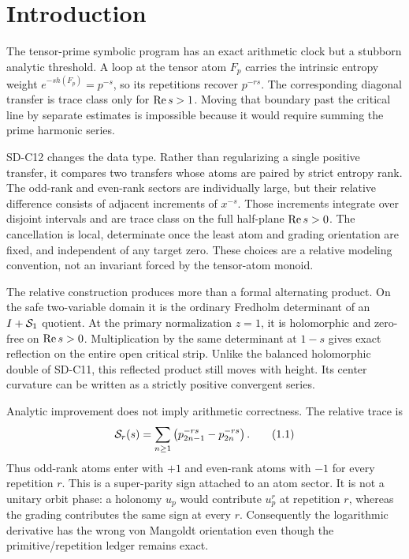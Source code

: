\section{Introduction}
\label{sec:introduction}

The tensor-prime symbolic program has an exact arithmetic clock but a stubborn
analytic threshold.  A loop at the tensor atom $F_p$ carries the intrinsic
entropy weight $e^{-s h(F_p)}=p^{-s}$, so its repetitions recover $p^{-rs}$.
The corresponding diagonal transfer is trace class only for $\operatorname{Re} s>1$.
Moving that boundary past the critical line by separate estimates is
impossible because it would require summing the prime harmonic series.

SD-C12 changes the data type.  Rather than regularizing a single positive
transfer, it compares two transfers whose atoms are paired by strict entropy
rank.  The odd-rank and even-rank sectors are individually large, but their
relative difference consists of adjacent increments of $x^{-s}$.  Those
increments integrate over disjoint intervals and are trace class on the full
half-plane $\operatorname{Re} s>0$.  The cancellation is local, determinate once the
least atom and grading orientation are fixed, and independent of any target
zero.  These choices are a relative modeling convention, not an invariant
forced by the tensor-atom monoid.

The relative construction produces more than a formal alternating product.
On the safe two-variable domain it is the ordinary Fredholm determinant of an
$I+\mathcal S_1$ quotient.  At the primary normalization $z=1$, it is holomorphic and
zero-free on $\operatorname{Re} s>0$.  Multiplication by the same determinant at $1-s$
gives exact reflection on the entire open critical strip.  Unlike the balanced
holomorphic double of SD-C11, this reflected product still moves with height.
Its center curvature can be written as a strictly positive convergent series.



Analytic improvement does not imply arithmetic correctness.  The relative
trace is
\[
 \mathcal S_r(s)=\sum_{n\ge1}
 \left(p_{2n-1}^{-rs}-p_{2n}^{-rs}\right).       \tag{1.1}
\]
Thus odd-rank atoms enter with $+1$ and even-rank atoms with $-1$ for every
repetition $r$.  This is a super-parity sign attached to an atom sector.  It
is not a unitary orbit phase: a holonomy $u_p$ would contribute $u_p^r$ at
repetition $r$, whereas the grading contributes the same sign at every $r$.
Consequently the logarithmic derivative has the wrong von Mangoldt
orientation even though the primitive/repetition ledger remains exact.

